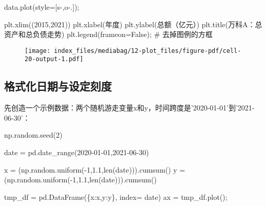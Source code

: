 \documentclass[
  letterpaper,
  DIV=11,
  numbers=noendperiod]{scrreprt}
\newenvironment{Shaded}{\begin{snugshade}}{\end{snugshade}}
\newcommand{\BuiltInTok}[1]{\textcolor[rgb]{0.00,0.23,0.31}{#1}}
\newcommand{\CommentTok}[1]{\textcolor[rgb]{0.37,0.37,0.37}{#1}}
\newcommand{\DecValTok}[1]{\textcolor[rgb]{0.68,0.00,0.00}{#1}}
\newcommand{\FloatTok}[1]{\textcolor[rgb]{0.68,0.00,0.00}{#1}}
\newcommand{\NormalTok}[1]{\textcolor[rgb]{0.00,0.23,0.31}{#1}}
\newcommand{\OperatorTok}[1]{\textcolor[rgb]{0.37,0.37,0.37}{#1}}
\newcommand{\StringTok}[1]{\textcolor[rgb]{0.13,0.47,0.30}{#1}}
\newcommand{\VariableTok}[1]{\textcolor[rgb]{0.07,0.07,0.07}{#1}}
\begin{document}
\begin{Shaded}
\begin{Highlighting}[]
\NormalTok{data.plot(style}\OperatorTok{=}\NormalTok{[}\StringTok{\textquotesingle{}s{-}\textquotesingle{}}\NormalTok{,}\StringTok{\textquotesingle{}o{-}.\textquotesingle{}}\NormalTok{])}\OperatorTok{;} 

\NormalTok{plt.xlim((}\StringTok{\textquotesingle{}2015\textquotesingle{}}\NormalTok{,}\StringTok{\textquotesingle{}2021\textquotesingle{}}\NormalTok{))}
\NormalTok{plt.xlabel(}\StringTok{\textquotesingle{}年度\textquotesingle{}}\NormalTok{)}
\NormalTok{plt.ylabel(}\StringTok{\textquotesingle{}总额（亿元）\textquotesingle{}}\NormalTok{)}
\NormalTok{plt.title(}\StringTok{\textquotesingle{}万科A：总资产和总负债走势\textquotesingle{}}\NormalTok{)}
\NormalTok{plt.legend(frameon}\OperatorTok{=}\VariableTok{False}\NormalTok{)}\OperatorTok{;} \CommentTok{\# 去掉图例的方框}
\end{Highlighting}
\end{Shaded}

\begin{figure}[H]

{\centering \texttt{[image: index\_files/mediabag/12-plot\_files/figure-pdf/cell-20-output-1.pdf]}

}

\end{figure}

\hypertarget{ux683cux5f0fux5316ux65e5ux671fux4e0eux8bbeux5b9aux523bux5ea6}{%
\subsection{格式化日期与设定刻度}\label{ux683cux5f0fux5316ux65e5ux671fux4e0eux8bbeux5b9aux523bux5ea6}}

先创造一个示例数据：两个随机游走变量x和y，时间跨度是'2020-01-01'到'2021-06-30'：

\begin{Shaded}
\begin{Highlighting}[]
\NormalTok{np.random.seed(}\DecValTok{2}\NormalTok{)}

\NormalTok{date }\OperatorTok{=}\NormalTok{ pd.date\_range(}\StringTok{\textquotesingle{}2020{-}01{-}01\textquotesingle{}}\NormalTok{,}\StringTok{\textquotesingle{}2021{-}06{-}30\textquotesingle{}}\NormalTok{)}

\NormalTok{x }\OperatorTok{=}\NormalTok{ (np.random.uniform(}\OperatorTok{{-}}\DecValTok{1}\NormalTok{,}\FloatTok{1.1}\NormalTok{,}\BuiltInTok{len}\NormalTok{(date))).cumsum()}
\NormalTok{y }\OperatorTok{=}\NormalTok{ (np.random.uniform(}\OperatorTok{{-}}\DecValTok{1}\NormalTok{,}\FloatTok{1.1}\NormalTok{,}\BuiltInTok{len}\NormalTok{(date))).cumsum()}

\NormalTok{tmp\_df }\OperatorTok{=}\NormalTok{ pd.DataFrame(\{}\StringTok{\textquotesingle{}x\textquotesingle{}}\NormalTok{:x,}\StringTok{\textquotesingle{}y\textquotesingle{}}\NormalTok{:y\}, index}\OperatorTok{=}\NormalTok{ date)}
\NormalTok{ax }\OperatorTok{=}\NormalTok{ tmp\_df.plot()}\OperatorTok{;}
\end{Highlighting}
\end{Shaded}
\end{document}
